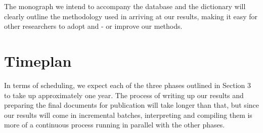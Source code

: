 \documentclass[a4paper]{article}
\begin{document}
The monograph we intend to accompany the database and the dictionary will clearly outline the methodology used in arriving at our results, making it easy for other researchers to adopt and - or improve our methods.




\section{Timeplan}
In terms of scheduling, we expect each of the three phases outlined in Section 3 to take up approximately one year. The process of writing up our results and preparing the final documents for publication will take longer than that, but since our results will come in incremental batches, interpreting and compiling them is more of a continuous process running in parallel with the other phases.





{}
%

\end{document}
